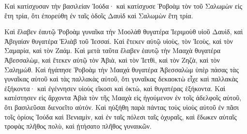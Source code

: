 {Καὶ κατίσχυσαν τὴν βασιλείαν Ἰούδα· καὶ κατίσχυσε Ῥοβοὰμ τὸν τοῦ Σαλωμὼν εἰς ἔτη τρία, ὅτι ἐπορεύθη ἐν ταῖς ὁδοῖς Δαυὶδ καὶ Σαλωμὼν ἔτη τρία.
\par }{\PP {}Καὶ ἔλαβεν ἑαυτῷ Ῥοβοὰμ γυναῖκα τὴν Μοολὰθ θυγατέρα Ἱεριμοὺθ υἱοῦ Δαυὶδ, καὶ Ἀβιγαίαν θυγατέρα Ἑλιὰβ τοῦ Ἰεσσαί.
Καὶ ἔτεκεν αὐτῷ υἱοὺς, τὸν Ἰεοὺς, καὶ τὸν Σαμαρία, καὶ τὸν Ζαάμ.
Καὶ μετὰ ταῦτα ἔλαβεν ἑαυτῷ τὴν Μααχὰ θυγατέρα Ἀβεσσαλὼμ, καὶ ἔτεκεν αὐτῷ τὸν Ἀβιὰ, καὶ τὸν Ἰετθὶ, καὶ τὸν Ζηζὰ, καὶ τὸν Σαλημώθ.
Καὶ ἠγάπησε Ῥοβοὰμ τὴν Μααχά θυγατέρα Ἀβεσσαλὼμ ὑπὲρ πάσας τὰς γυναῖκας αὐτοῦ καὶ τὰς παλλακὰς αὐτοῦ, ὅτι γυναῖκας δεκαοκτὼ εἶχε καὶ παλλακὰς ἑξήκοντα· καὶ ἐγέννησεν υἱοὺς εἴκοσι καὶ ὀκτὼ, καὶ θυγατέρας ἑξήκοντα.
Καὶ κατέστησεν εἰς ἄρχοντα Ἀβιὰ τὸν τῆς Μααχὰ εἰς ἡγούμενον ἐν τοῖς ἀδελφοῖς αὐτοῦ, ὅτι βασιλεῦσαι διενοεῖτο αὐτόν.
Καὶ ηὐξήθη παρὰ πάντας τοὺς υἱοὺς αὐτοῦ ἐν πᾶσι τοῖς ὁρίοις Ἰούδα καὶ Βενιαμὶν, καὶ ἐν ταῖς πόλεσι ταῖς ὀχυραῖς, καὶ ἔδωκεν αὐταῖς τροφὰς πλῆθος πολὺ, καὶ ᾐτήσατο πλῆθος γυναικῶν.

}
